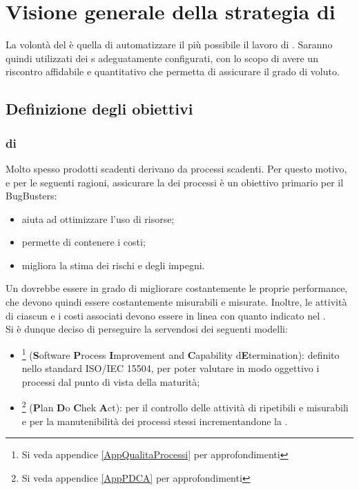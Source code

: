 \section{Visione generale della strategia di }
La volontà del  è quella di automatizzare il più possibile il lavoro di . Saranno quindi utilizzati dei s adeguatamente configurati, con lo scopo di avere un riscontro affidabile e quantitativo che permetta di assicurare il grado di  voluto. 

\subsection{Definizione degli obiettivi}
\subsubsection{ di }
Molto spesso prodotti scadenti derivano da processi scadenti. Per questo motivo, e per le seguenti ragioni, assicurare la  dei processi è un obiettivo primario per il  BugBusters:
\begin{itemize}
	\item aiuta ad ottimizzare l'uso di risorse;
	\item permette di contenere i costi;
	\item migliora la stima dei rischi e degli impegni.
\end{itemize}
Un  dovrebbe essere in grado di migliorare costantemente le proprie performance, che devono quindi essere costantemente misurabili e misurate. Inoltre, le attività di ciascun  e i costi associati devono essere in linea con quanto indicato nel \PianoDiProgetto. \\
Si è dunque deciso di perseguire la  servendosi dei seguenti modelli: 
\begin{itemize}
	\item {}\footnote{Si veda appendice \ref{AppQualitaProcessi} per approfondimenti} (\textbf{S}oftware \textbf{P}rocess \textbf{I}mprovement and \textbf{C}apability d\textbf{E}termination): definito nello standard ISO/IEC 15504, per poter valutare in modo oggettivo i processi dal punto di vista della maturità;
	\item {}\footnote{Si veda appendice \ref{AppPDCA} per approfondimenti} (\textbf{P}lan \textbf{D}o \textbf{C}hek \textbf{A}ct): per il controllo delle attività di  ripetibili e misurabili e per la manutenibilità dei processi stessi incrementandone la .
\end{itemize}

